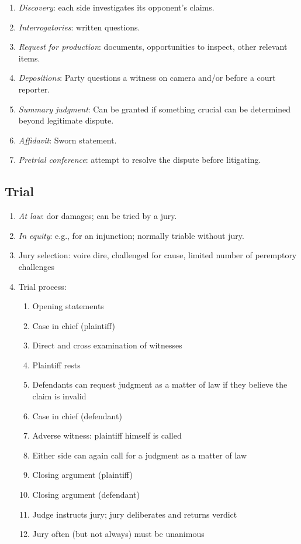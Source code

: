 \begin{enumerate}
    \item \emph{Discovery}: each side investigates its opponent's claims.
    \item \emph{Interrogatories}: written questions.
    \item \emph{Request for production}: documents, opportunities to inspect, other relevant items.
    \item \emph{Depositions}: Party questions a witness on camera and/or before a court reporter.
    \item \emph{Summary judgment}: Can be granted if something crucial can be determined beyond legitimate dispute.
    \item \emph{Affidavit}: Sworn statement.
    \item \emph{Pretrial conference}: attempt to resolve the dispute before litigating.
\end{enumerate}

\subsection{Trial}

\begin{enumerate}
    \item \emph{At law}: dor damages; can be tried by a jury.
    \item \emph{In equity}: e.g., for an injunction; normally triable without jury.
    \item Jury selection: voire dire, challenged for cause, limited number of peremptory challenges
    \item Trial process:
    \begin{enumerate}
        \item Opening statements
        \item Case in chief (plaintiff)
        \item Direct and cross examination of witnesses
        \item Plaintiff rests
        \item Defendants can request judgment as a matter of law if they believe the claim is invalid
        \item Case in chief (defendant)
        \item Adverse witness: plaintiff himself is called
        \item Either side can again call for a judgment as a matter of law
        \item Closing argument (plaintiff)
        \item Closing argument (defendant)
        \item Judge instructs jury; jury deliberates and returns verdict
        \item Jury often (but not always) must be unanimous
    \end{enumerate}
\end{enumerate}

